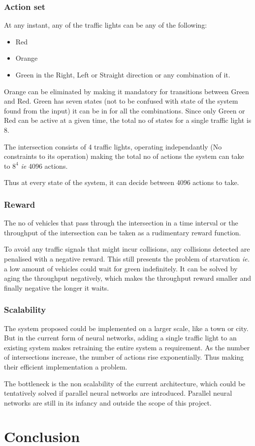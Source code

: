 \documentclass[a4paper,11pt]{article}
\begin{document}
			\subsubsection{Action set}
				At any instant, any of the traffic lights can be any of the following:
				\begin{itemize}
					\setlength\itemsep{0em}
					\item Red
					\item Orange
					\item Green in the Right, Left or Straight direction or any combination of it.
				\end{itemize}

				Orange can be eliminated by making it mandatory for transitions between Green and Red. Green has seven states (not to be confused with state of the system found from the input) it can be in for all the combinations. Since only Green or Red can be active at a given time, the total no of states for a single traffic light is 8.

				The intersection consists of 4 traffic lights, operating independantly (No constraints to its operation) making the total no of actions the system can take to $8^4$ \emph{ie} 4096 actions.

				Thus at every state of the system, it can decide between 4096 actions to take.
			\subsubsection{Reward}
				The no of vehicles that pass through the intersection in a time interval or the throughput of the intersection can be taken as a rudimentary reward function.

				To avoid any traffic signals that might incur collisions, any collisions detected are penalised with a negative reward. This still presents the problem of starvation \emph{ie.} a low amount of vehicles could wait for green indefinitely. It can be solved by aging the throughput negatively, which makes the throughput reward smaller and finally negative the longer it waits.
			\subsubsection{Scalability}
				The system proposed could be implemented on a larger scale, like a town or city. But in the current form of neural networks, adding a single traffic light to an existing system makes retraining the entire system a requirement. As the number of intersections increase, the number of actions rise exponentially. Thus making their efficient implementation a problem.

				The bottleneck is the non scalability of the current architecture, which could be tentatively solved if parallel neural networks are introduced. Parallel neural networks are still in its infancy and outside the scope of this project.
	\section{Conclusion}



	\newpage
	\nocite{*}
	
	
\end{document}
